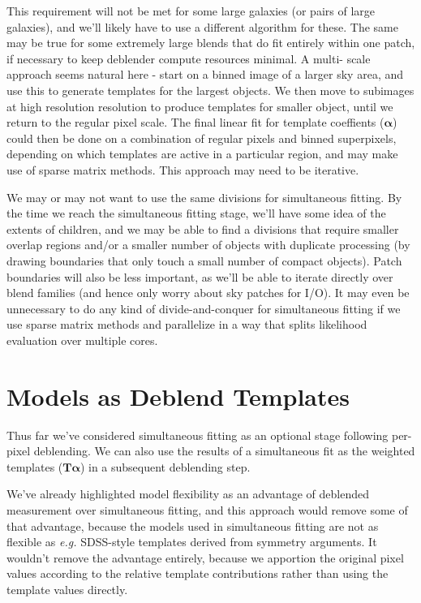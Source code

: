 \documentclass[10pt]{article}
\begin{document}
This requirement will not be met for some large galaxies (or pairs of large
galaxies), and we'll likely have to use a different algorithm for these.  The
same may be true for some extremely large blends that do fit entirely within
one patch, if necessary to keep deblender compute resources minimal.  A multi-
scale approach seems natural here - start on a binned image of a larger sky
area, and use this to generate templates for the largest objects.  We then
move to subimages at high resolution resolution to produce templates for
smaller object, until we return to the regular pixel scale. The final linear
fit for template coeffients ($\bm{\alpha}$) could then be done on a
combination of regular pixels and binned superpixels, depending on which
templates are active in a particular region, and may make use of sparse matrix
methods.  This approach may need to be iterative.

We may or may not want to use the same divisions for simultaneous fitting.  By
the time we reach the simultaneous fitting stage, we'll have some idea of the
extents of children, and we may be able to find a divisions that require
smaller overlap regions and/or a smaller number of objects with duplicate
processing (by drawing boundaries that only touch a small number of compact
objects). Patch boundaries will also be less important, as we'll be able to
iterate directly over blend families (and hence only worry about sky patches
for I/O).  It may even be unnecessary to do any kind of divide-and-conquer for
simultaneous fitting if we use sparse matrix methods and parallelize in a way
that splits likelihood evaluation over multiple cores.

\section{Models as Deblend Templates}

\label{sec:models-as-templates}

Thus far we've considered simultaneous fitting as an optional stage following
per-pixel deblending.  We can also use the results of a simultaneous fit as
the weighted templates ($\bm{T}\bm{\alpha}$) in a subsequent deblending step.

We've already highlighted model flexibility as an advantage of deblended
measurement over simultaneous fitting, and this approach would remove
some of that advantage, because the models used in simultaneous fitting are
not as flexible as {\em e.g.} SDSS-style templates derived from symmetry
arguments.  It wouldn't remove the advantage entirely, because we apportion
the original pixel values according to the relative template contributions
rather than using the template values directly.
\end{document}
